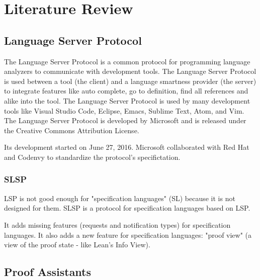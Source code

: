 \chapter{Literature Review}
\label{chap:lr}

\section{Language Server Protocol}

The Language Server Protocol is a common protocol for programming language analyzers to communicate with development tools. The Language Server Protocol is used between a tool (the client) and a language smartness provider (the server) to integrate features like auto complete, go to definition, find all references and alike into the tool. The Language Server Protocol is used by many development tools like Visual Studio Code, Eclipse, Emacs, Sublime Text, Atom, and Vim. The Language Server Protocol is developed by Microsoft and is released under the Creative Commons Attribution License.

Its development started on June 27, 2016.
Microsoft collaborated with Red Hat and Codenvy to standardize the protocol's specifictation.

\subsection{SLSP}

LSP is not good enough for "specification languages" (SL) because it is not designed for them. SLSP is a protocol for specification languages based on LSP.

It adds missing features (requests and notification types) for specification languages. It also adds a new feature for specification languages: "proof view" (a view of the proof state - like Lean's Info View).


\section{Proof Assistants}
